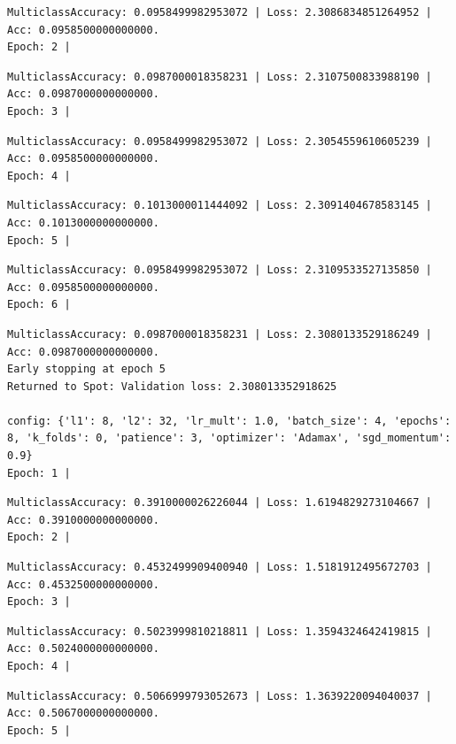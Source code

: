 \documentclass[
  letterpaper,
  DIV=11,
  numbers=noendperiod]{scrreprt}
\begin{document}
\begin{verbatim}
MulticlassAccuracy: 0.0958499982953072 | Loss: 2.3086834851264952 | Acc: 0.0958500000000000.
Epoch: 2 | 
\end{verbatim}

\begin{verbatim}
MulticlassAccuracy: 0.0987000018358231 | Loss: 2.3107500833988190 | Acc: 0.0987000000000000.
Epoch: 3 | 
\end{verbatim}

\begin{verbatim}
MulticlassAccuracy: 0.0958499982953072 | Loss: 2.3054559610605239 | Acc: 0.0958500000000000.
Epoch: 4 | 
\end{verbatim}

\begin{verbatim}
MulticlassAccuracy: 0.1013000011444092 | Loss: 2.3091404678583145 | Acc: 0.1013000000000000.
Epoch: 5 | 
\end{verbatim}

\begin{verbatim}
MulticlassAccuracy: 0.0958499982953072 | Loss: 2.3109533527135850 | Acc: 0.0958500000000000.
Epoch: 6 | 
\end{verbatim}

\begin{verbatim}
MulticlassAccuracy: 0.0987000018358231 | Loss: 2.3080133529186249 | Acc: 0.0987000000000000.
Early stopping at epoch 5
Returned to Spot: Validation loss: 2.308013352918625

config: {'l1': 8, 'l2': 32, 'lr_mult': 1.0, 'batch_size': 4, 'epochs': 8, 'k_folds': 0, 'patience': 3, 'optimizer': 'Adamax', 'sgd_momentum': 0.9}
Epoch: 1 | 
\end{verbatim}

\begin{verbatim}
MulticlassAccuracy: 0.3910000026226044 | Loss: 1.6194829273104667 | Acc: 0.3910000000000000.
Epoch: 2 | 
\end{verbatim}

\begin{verbatim}
MulticlassAccuracy: 0.4532499909400940 | Loss: 1.5181912495672703 | Acc: 0.4532500000000000.
Epoch: 3 | 
\end{verbatim}

\begin{verbatim}
MulticlassAccuracy: 0.5023999810218811 | Loss: 1.3594324642419815 | Acc: 0.5024000000000000.
Epoch: 4 | 
\end{verbatim}

\begin{verbatim}
MulticlassAccuracy: 0.5066999793052673 | Loss: 1.3639220094040037 | Acc: 0.5067000000000000.
Epoch: 5 | 
\end{verbatim}
\end{document}
